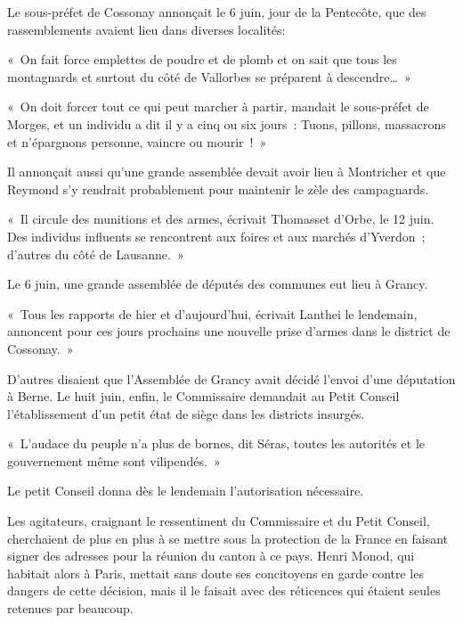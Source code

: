 \documentclass[french,twoside]{book} %
\newenvironment{quoteblock}%
  {\begin{quoting}}
  {\end{quoting}}
\newenvironment{quotebar}{%
    \def\FrameCommand{{\color{rubric!10!}\vrule width 0.5em} \hspace{0.9em}}%
    \def\OuterFrameSep{\itemsep} %
    \MakeFramed {\advance\hsize-\width \FrameRestore}
  }%
  {%
    \endMakeFramed
  }
\renewenvironment{quoteblock}%
  {%
    \savenotes
    \setstretch{0.9}
    \normalfont
    \begin{quotebar}
  }
  {%
    \end{quotebar}
    \spewnotes
  }
\begin{document}
\noindent Le sous-préfet de Cossonay annonçait le 6 juin, jour de la Pentecôte, que des rassemblements avaient lieu dans diverses localités:\par

\begin{quoteblock}
 \noindent « On fait force emplettes de poudre et de plomb et on sait que tous les montagnards et surtout du côté de Vallorbes se préparent à descendre… »\par
 « On doit forcer tout ce qui peut marcher à partir, mandait le sous-préfet de Morges, et un individu a dit il y a cinq ou six jours : Tuons, pillons, massacrons et n’épargnons personne, vaincre ou mourir ! »
 \end{quoteblock}

\noindent Il annonçait aussi qu’une grande assemblée devait avoir lieu à Montricher et que Reymond s’y rendrait probablement pour maintenir le zèle des campagnards.\par

\begin{quoteblock}
\noindent « Il circule des munitions et des armes, écrivait Thomasset d’Orbe, le 12 juin. Des individus influents se rencontrent aux foires et aux marchés d’Yverdon ; d’autres du côté de Lausanne. »\end{quoteblock}

\noindent Le 6 juin, une grande assemblée de députés des communes eut lieu à Grancy.\par

\begin{quoteblock}
\noindent « Tous les rapports de hier et d’aujourd’hui, écrivait Lanthei le lendemain, annoncent pour ces jours prochains une nouvelle prise d’armes dans le district de Cossonay. »\end{quoteblock}

\noindent D’autres disaient que l’Assemblée de Grancy avait décidé l’envoi d’une députation à Berne. Le huit juin, enfin, le Commissaire demandait au Petit Conseil l’établissement d’un petit état de siège dans les districts insurgés.\par

\begin{quoteblock}
\noindent « L’audace du peuple n’a plus de bornes, dit Séras, toutes les autorités et le gouvernement même sont vilipendés. »\end{quoteblock}

\noindent Le petit Conseil donna dès le lendemain l’autorisation nécessaire.\par
Les agitateurs, craignant le ressentiment du Commissaire et du Petit Conseil, cherchaient de plus en plus à se mettre sous la protection de la France en faisant signer des adresses pour la réunion du canton à ce pays. Henri Monod, qui habitait alors à Paris, mettait sans doute ses concitoyens en garde contre les dangers de cette décision, mais il le faisait avec des réticences qui étaient seules retenues par beaucoup.\par
\end{document}

